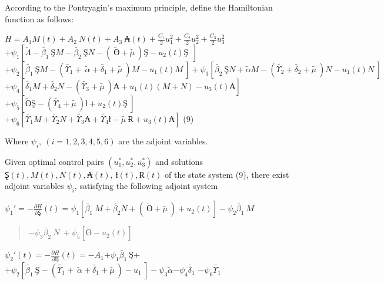 According to the Pontryagin's maximum principle, define the Hamiltonian function as follows:

\(H = A_{1}M(t) + A_{2}\ N(t) + A_{3}\ ₳(t) + \frac{C_{1}}{2}u_{1}^{2} + \frac{C_{2}}{2}u_{2}^{2} + \frac{C_{3}}{2}u_{3}^{2}\) \(+ \psi_{1}\left\lbrack \widetilde{\Lambda} - \widetilde{\beta_{1}}\ ŞM - \widetilde{\beta_{2}}\ ŞN - \left( \ \widetilde{Ө} + \widetilde{\mu\ } \right)Ş - u_{2}(t)Ş\ \  \right\rbrack\) \(+ \psi_{2}\left\lbrack \widetilde{\beta_{1}}\ ŞM - \left( \widetilde{\Upsilon_{1}} + \ \widetilde{\alpha} + \widetilde{\delta_{1}} + \widetilde{\mu\ } \right)M - u_{1}(t)M\  \right\rbrack + \psi_{3}\left\lbrack \widetilde{\beta_{2}}\ ŞN + \widetilde{\alpha}M - \left( \widetilde{\Upsilon_{2}} + \widetilde{\delta_{2}} + \widetilde{\mu\ } \right)N - u_{1}(t)N\  \right\rbrack\) \(+ \psi_{4}\left\lbrack \widetilde{\delta_{1}}M + \widetilde{\delta_{2}}N - \left( \widetilde{\Upsilon_{3}} + \widetilde{\mu\ } \right)₳ + u_{1}(t)(M + N) - u_{3}(t)₳ \right\rbrack\) \(+ \psi_{5}\left\lbrack \widetilde{Ө}Ş - \left( \widetilde{\Upsilon_{4}} + \widetilde{\mu\ } \right)ƚ + u_{2}(t)Ş\  \right\rbrack\) \(+ \psi_{6}\left\lbrack \widetilde{\Upsilon_{1}}M + \widetilde{\Upsilon_{2}}N + \widetilde{\Upsilon_{3}}₳ + \widetilde{\Upsilon_{4}}ƚ - \widetilde{\mu\ }Ɍ + u_{3}(t)₳ \right\rbrack\) (9)

Where \(\psi_{i},\ (i = 1,2,3,4,5,6)\) are the adjoint variables.

Given optimal control pairs \(\left( u_{1}^{*},u_{2}^{*},u_{3}^{*} \right)\) and solutions \(Ȿ(t),M(t),N(t),₳(t),\ ƚ(t),Ɍ(t)\) of the state system (9), there exist adjoint variables \(\psi_{i}\), satisfying the following adjoint system

\(\psi_{1}' = - \frac{\partial H}{\partial Ȿ}(t) = \psi_{1}\left\lbrack \widetilde{\beta_{1}}\ M + \widetilde{\beta_{2}}N + \left( \ \widetilde{Ө} + \widetilde{\mu\ } \right) + u_{2}(t) \right\rbrack - \psi_{2}\widetilde{\beta_{1}}\ M\)

\begin{quote}
\(- \psi_{3}\widetilde{\beta_{2}}\ N\  + \psi_{5}\left\lbrack \widetilde{Ө} - u_{2}(t) \right\rbrack\)
\end{quote}

\(\psi_{2}'(t) = - \frac{\partial H}{\partial Ę}(t) = - A_{1}\)+\(\psi_{1}\widetilde{\beta_{1}}\ Ş\)+\(+ \psi_{2}\left\lbrack \widetilde{\beta_{1}}\ Ş - \left( \widetilde{\Upsilon_{1}} + \ \widetilde{\alpha} + \widetilde{\delta_{1}} + \widetilde{\mu\ } \right) - u_{1}\  \right\rbrack - \psi_{3}\widetilde{\alpha}{- \psi}_{4}\widetilde{\delta_{1}}\) \(- \psi_{6}\widetilde{\Upsilon_{1}}\)

